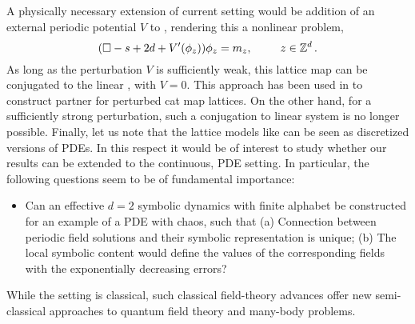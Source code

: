 A physically necessary extension of  current setting would be addition of an
external periodic potential ${V}$ to , rendering this a
nonlinear problem,
 \begin{equation}
 (\Box - s+ 2d+ {V}'(\phi_z)) \phi_z = {m_{z}}, \hspace*{25pt} z\in \mathbb{Z}^{d}
 \,. \label{LinearConnPerturbed}
\end{equation}
As long as the perturbation ${V}$ is sufficiently weak, this lattice map can
be conjugated to the linear {\catlatt}, with ${V}=0$.
This approach has been used in  to construct partner
{\twots} for perturbed cat map lattices.
On the other hand, for a sufficiently strong perturbation, such a conjugation
to linear system is no longer possible. Finally, let us note that the lattice
models like   can be seen  as discretized versions
of PDEs.
In this respect it would be of  interest  to study whether our results  can
be extended to the continuous, PDE setting. In particular,  the following
questions  seem to be  of fundamental importance:

 \begin{itemize}
\item
 Can  an effective $d=2$ symbolic dynamics with finite alphabet  be
 constructed for an example of a PDE with {\spt} chaos, such
 that
 (a)  Connection between periodic field  solutions and their
 symbolic representation is unique;
 (b) The local  symbolic content would
 define  the values of the corresponding fields with the exponentially
 decreasing errors?
\end{itemize}

While the setting is classical,
such classical field-theory advances offer new semi-classical
approaches to quantum field theory and many-body problems.

